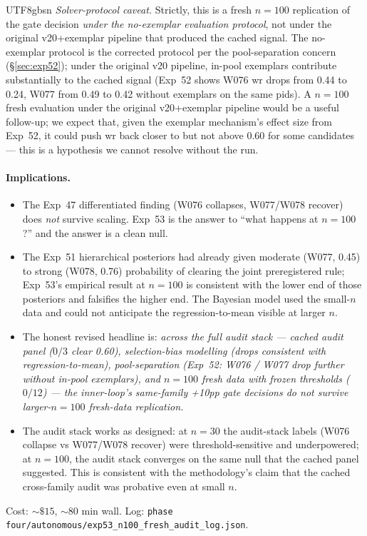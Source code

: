 \documentclass{article}
\begin{document}
\begin{CJK*}{UTF8}{gbsn}
\noindent\emph{Solver-protocol caveat.} Strictly, this is a fresh
\(n=100\) replication of the gate decision \emph{under the
no-exemplar evaluation protocol}, not under the original
v20+exemplar pipeline that produced the cached signal. The
no-exemplar protocol is the corrected protocol per the
pool-separation concern (\S\ref{sec:exp52}); under the original
v20 pipeline, in-pool exemplars contribute substantially to the
cached signal (Exp~52 shows W076 wr drops from 0.44 to 0.24, W077
from 0.49 to 0.42 without exemplars on the same pids). A
\(n=100\) fresh evaluation under the original v20+exemplar
pipeline would be a useful follow-up; we expect that, given the
exemplar mechanism's effect size from Exp~52, it could push wr
back closer to but not above \(0.60\) for some candidates ---
this is a hypothesis we cannot resolve without the run.

\paragraph{Implications.}
\begin{itemize}[leftmargin=*,topsep=2pt,itemsep=2pt]
  \item The Exp~47 differentiated finding (W076 collapses,
    W077/W078 recover) does \emph{not} survive scaling. Exp~53
    is the answer to ``what happens at \(n=100\)?'' and the
    answer is a clean null.
  \item The Exp~51 hierarchical posteriors had already given
    moderate (W077, 0.45) to strong (W078, 0.76) probability of
    clearing the joint preregistered rule; Exp~53's empirical
    result at \(n=100\) is consistent with the lower end of those
    posteriors and falsifies the higher end. The Bayesian model
    used the small-\(n\) data and could not anticipate the
    regression-to-mean visible at larger \(n\).
  \item The honest revised headline is: \emph{across the full
    audit stack --- cached audit panel (\(0/3\) clear 0.60),
    selection-bias modelling (drops consistent with
    regression-to-mean), pool-separation (Exp~52: W076 / W077
    drop further without in-pool exemplars), and \(n=100\) fresh
    data with frozen thresholds (\(0/12\)) --- the inner-loop's
    same-family +10pp gate decisions do not survive
    larger-\(n=100\) fresh-data replication.}
  \item The audit stack works as designed: at \(n=30\) the
    audit-stack labels (W076 collapse vs W077/W078 recover) were
    threshold-sensitive and underpowered; at \(n=100\), the
    audit stack converges on the same null that the cached panel
    suggested. This is consistent with the methodology's claim
    that the cached cross-family audit was probative even at
    small \(n\).
\end{itemize}
Cost: \(\sim\$15\), \(\sim 80\) min wall. Log:
\texttt{phase four/autonomous/exp53\_n100\_fresh\_audit\_log.json}.


\end{CJK*}
\end{document}
